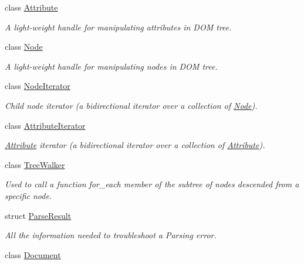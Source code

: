 \begin{DoxyCompactItemize}
class \hyperlink{classphys_1_1xml_1_1Attribute}{Attribute}
\begin{DoxyCompactList}\small\item\em A light-\/weight handle for manipulating attributes in DOM tree. \item\end{DoxyCompactList}\item 
class \hyperlink{classphys_1_1xml_1_1Node}{Node}
\begin{DoxyCompactList}\small\item\em A light-\/weight handle for manipulating nodes in DOM tree. \item\end{DoxyCompactList}\item 
class \hyperlink{classphys_1_1xml_1_1NodeIterator}{NodeIterator}
\begin{DoxyCompactList}\small\item\em Child node iterator (a bidirectional iterator over a collection of \hyperlink{classphys_1_1xml_1_1Node}{Node}). \item\end{DoxyCompactList}\item 
class \hyperlink{classphys_1_1xml_1_1AttributeIterator}{AttributeIterator}
\begin{DoxyCompactList}\small\item\em \hyperlink{classphys_1_1xml_1_1Attribute}{Attribute} iterator (a bidirectional iterator over a collection of \hyperlink{classphys_1_1xml_1_1Attribute}{Attribute}). \item\end{DoxyCompactList}\item 
class \hyperlink{classphys_1_1xml_1_1TreeWalker}{TreeWalker}
\begin{DoxyCompactList}\small\item\em Used to call a function for\_\-each member of the subtree of nodes descended from a specific node. \item\end{DoxyCompactList}\item 
struct \hyperlink{structphys_1_1xml_1_1ParseResult}{ParseResult}
\begin{DoxyCompactList}\small\item\em All the information needed to troubleshoot a Parsing error. \item\end{DoxyCompactList}\item 
class \hyperlink{classphys_1_1xml_1_1Document}{Document}

\end{DoxyCompactItemize}
